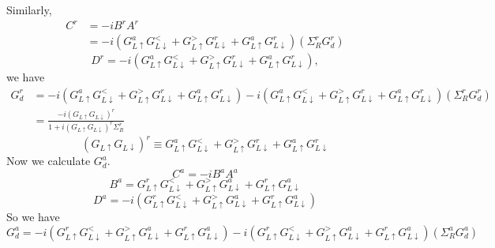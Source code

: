 \documentclass[aps,prb,onecolumn,amssymb,amsmath,superscriptaddress]{revtex4-1}
\begin{document}
Similarly, 
\begin{equation}
\begin{split}
C^{r}&=-iB^{r} A^{r} \\
&=-i(G_{L \uparrow}^{a} G_{L \downarrow}^{<}+G_{L \uparrow}^{>} G_{L \downarrow}^{r}+G_{L \uparrow}^{a} G_{L \downarrow}^{r})(\Sigma_{R}^{r} G_{d}^{r})
\end{split}
\end{equation}
\begin{equation}
D^{r}=-i(G_{L \uparrow}^{a} G_{L \downarrow}^{<}+G_{L \uparrow}^{>} G_{L \downarrow}^{r}+G_{L \uparrow}^{a} G_{L \downarrow}^{r}),
\end{equation}
we have
\begin{equation}
\begin{split}
G_{d}^{r} &=  -i(G_{L \uparrow}^{a} G_{L \downarrow}^{<}+G_{L \uparrow}^{>} G_{L \downarrow}^{r}+G_{L \uparrow}^{a} G_{L \downarrow}^{r})-i(G_{L \uparrow}^{a} G_{L \downarrow}^{<}+G_{L \uparrow}^{>} G_{L \downarrow}^{r}+G_{L \uparrow}^{a} G_{L \downarrow}^{r})(\Sigma_{R}^{r} G_{d}^{r}) \\
&=\frac{-i\left(G_{L \uparrow} G_{L \downarrow}\right)^{r}}{ 1+i\left(G_{L \uparrow} G_{L \downarrow}\right)^{r} \Sigma_{R}^{r}}
\end{split}
\end{equation}
\begin{equation}
(G_{L \uparrow} G_{L \downarrow})^{r} \equiv G_{L \uparrow}^{a} G_{L \downarrow}^{<}+G_{L \uparrow}^{>} G_{L \downarrow}^{r}+G_{L \uparrow}^{a} G_{L \downarrow}^{r}
\end{equation}
Now we calculate $G_{d}^{a}$.
\begin{equation}
C^{a}=-iB^{a} A^{a}
\end{equation}
\begin{equation}
B^{a}=G_{L \uparrow}^{r} G_{L \downarrow}^{<}+G_{L \uparrow}^{>} G_{L \downarrow}^{a}+G_{L \uparrow}^{r} G_{L \downarrow}^{a}
\end{equation}
\begin{equation}
D^{a}=-i(G_{L \uparrow}^{r} G_{L \downarrow}^{<}+G_{L \uparrow}^{>} G_{L \downarrow}^{a}+G_{L \uparrow}^{r} G_{L \downarrow}^{a})
\end{equation}
So we have
\begin{equation}
G_{d}^{a} = -i(G_{L \uparrow}^{r} G_{L \downarrow}^{<}+G_{L \uparrow}^{>} G_{L \downarrow}^{a}+G_{L \uparrow}^{r} G_{L \downarrow}
^{a})-i(G_{L \uparrow}^{r} G_{L \downarrow}^{<}+G_{L \uparrow}^{>} G_{L \downarrow}^{a}+G_{L \uparrow}^{r} G_{L \downarrow}^{a})(\Sigma_{R}^{a} G_{d}^{a})
\end{equation}
\end{document}
